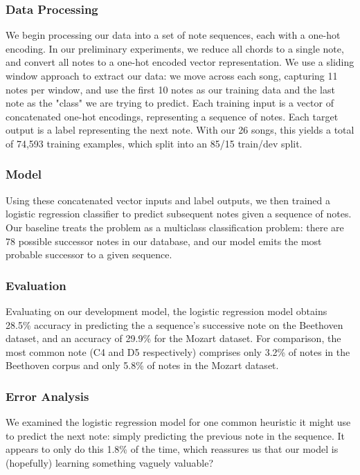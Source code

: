 \documentclass[twoside,twocolumn]{article}
\begin{document}
\subsubsection{Data Processing}
We begin processing our data into a set of note sequences, each with a one-hot encoding. In our preliminary experiments, we reduce all chords to a single note, and convert all notes to a one-hot encoded vector representation. We use a sliding window approach to extract our data: we move across each song, capturing 11 notes per window, and use the first 10 notes as our training data and the last note as the "class" we are trying to predict. Each training input is a vector of concatenated one-hot encodings, representing a sequence of notes. Each target output is a label representing the next note. With our 26 songs, this yields a total of 74,593 training examples, which split into an 85/15 train/dev split.

\subsubsection{Model}
Using these concatenated vector inputs and label outputs, we then trained a logistic regression classifier to predict subsequent notes given a sequence of notes. Our baseline treats the problem as a multiclass classification problem: there are 78 possible successor notes in our database, and our model emits the most probable successor to a given sequence.

\subsubsection{Evaluation}
Evaluating on our development model, the logistic regression model obtains 28.5\% accuracy in predicting the a sequence's successive note on the Beethoven dataset, and an accuracy of 29.9\% for the Mozart dataset. For comparison, the most common note (C4 and D5 respectively) comprises only 3.2\% of notes in the Beethoven corpus and only 5.8\% of notes in the Mozart dataset.

\subsubsection{Error Analysis}
We examined the logistic regression model for one common heuristic it might use to predict the next note: simply predicting the previous note in the sequence. It appears to only do this 1.8\% of the time, which reassures us that our model is (hopefully) learning something vaguely valuable?
\end{document}
